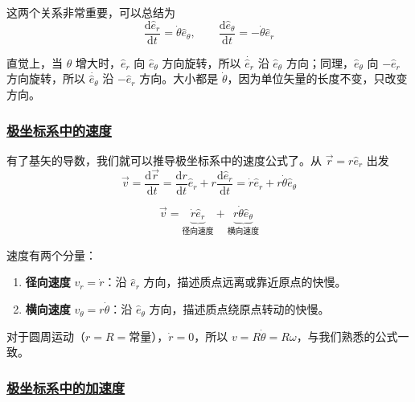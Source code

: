 这两个关系非常重要，可以总结为
\begin{equation}
    \boxed{
        \frac{\mathrm{d}\hat{e}_r}{\mathrm{d}t} = \dot{\theta}\hat{e}_\theta, \qquad
        \frac{\mathrm{d}\hat{e}_\theta}{\mathrm{d}t} = -\dot{\theta}\hat{e}_r
    }
\end{equation}

\begin{remark}
    直觉上，当 $\theta$ 增大时，$\hat{e}_r$ 向 $\hat{e}_\theta$ 方向旋转，所以 $\dot{\hat{e}_r}$ 沿 $\hat{e}_\theta$ 方向；同理，$\hat{e}_\theta$ 向 $-\hat{e}_r$ 方向旋转，所以 $\dot{\hat{e}_\theta}$ 沿 $-\hat{e}_r$ 方向。大小都是 $\dot{\theta}$，因为单位矢量的长度不变，只改变方向。
\end{remark}

\subsubsection{\protect\hyperlink{:}{极坐标系中的速度}}

有了基矢的导数，我们就可以推导极坐标系中的速度公式了。从 $\vec{r} = r\hat{e}_r$ 出发
\begin{equation}
    \vec{v} = \frac{\mathrm{d}\vec{r}}{\mathrm{d}t} = \frac{\mathrm{d}r}{\mathrm{d}t}\hat{e}_r + r\frac{\mathrm{d}\hat{e}_r}{\mathrm{d}t} = \dot{r}\hat{e}_r + r\dot{\theta}\hat{e}_\theta
\end{equation}

\begin{equation}
    \boxed{
        \vec{v} = \underbrace{\dot{r}\hat{e}_r}_{\text{径向速度}} + \underbrace{r\dot{\theta}\hat{e}_\theta}_{\text{横向速度}}
    }
\end{equation}

速度有两个分量：
\begin{enumerate}
    \item \textbf{径向速度} $v_r = \dot{r}$：沿 $\hat{e}_r$ 方向，描述质点远离或靠近原点的快慢。
    \item \textbf{横向速度} $v_\theta = r\dot{\theta}$：沿 $\hat{e}_\theta$ 方向，描述质点绕原点转动的快慢。
\end{enumerate}

\begin{remark}
    对于圆周运动（$r = R = \text{常量}$），$\dot{r} = 0$，所以 $v = R\dot{\theta} = R\omega$，与我们熟悉的公式一致。
\end{remark}

\subsubsection{\protect\hyperlink{:}{极坐标系中的加速度}}

